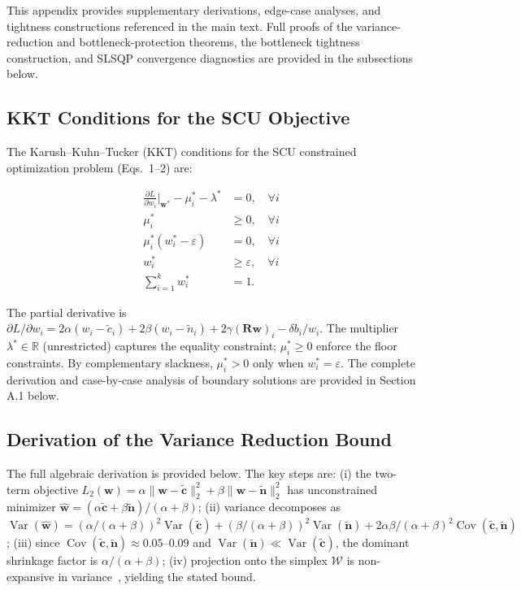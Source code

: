 \documentclass[a4paper,fleqn]{cas-sc}
\begin{document}
This appendix provides supplementary derivations, edge-case analyses, and tightness constructions referenced in the main text. Full proofs of the variance-reduction and bottleneck-protection theorems, the bottleneck tightness construction, and SLSQP convergence diagnostics are provided in the subsections below.

\subsection{KKT Conditions for the SCU Objective}
\label{app:kkt}

The Karush--Kuhn--Tucker (KKT) conditions for the SCU constrained optimization problem (Eqs.~1--2) are:

\begin{align}
\frac{\partial L}{\partial w_i}\bigg|_{\mathbf{w}^*} - \mu_i^* - \lambda^* &= 0, \quad \forall i \\
\mu_i^* &\ge 0, \quad \forall i \\
\mu_i^*(w_i^* - \varepsilon) &= 0, \quad \forall i \\
w_i^* &\ge \varepsilon, \quad \forall i \\
\sum_{i=1}^k w_i^* &= 1.
\end{align}

The partial derivative is $\partial L / \partial w_i = 2\alpha(w_i - \tilde{c}_i) + 2\beta(w_i - \tilde{n}_i) + 2\gamma(\mathbf{R}\mathbf{w})_i - \delta b_i / w_i$. The multiplier $\lambda^* \in \mathbb{R}$ (unrestricted) captures the equality constraint; $\mu_i^* \ge 0$ enforce the floor constraints. By complementary slackness, $\mu_i^* > 0$ only when $w_i^* = \varepsilon$. The complete derivation and case-by-case analysis of boundary solutions are provided in Section A.1 below.

\subsection{Derivation of the Variance Reduction Bound}
\label{app:variance-derivation}

The full algebraic derivation is provided below. The key steps are: (i) the two-term objective $L_2(\mathbf{w}) = \alpha\|\mathbf{w} - \tilde{\mathbf{c}}\|_2^2 + \beta\|\mathbf{w} - \tilde{\mathbf{n}}\|_2^2$ has unconstrained minimizer $\hat{\mathbf{w}} = (\alpha\tilde{\mathbf{c}} + \beta\tilde{\mathbf{n}})/(\alpha+\beta)$; (ii) variance decomposes as $\operatorname{Var}(\hat{\mathbf{w}}) = (\alpha/(\alpha+\beta))^2\operatorname{Var}(\tilde{\mathbf{c}}) + (\beta/(\alpha+\beta))^2\operatorname{Var}(\tilde{\mathbf{n}}) + 2\alpha\beta/(\alpha+\beta)^2\operatorname{Cov}(\tilde{\mathbf{c}}, \tilde{\mathbf{n}})$; (iii) since $\operatorname{Cov}(\tilde{\mathbf{c}}, \tilde{\mathbf{n}}) \approx 0.05$--$0.09$ and $\operatorname{Var}(\tilde{\mathbf{n}}) \ll \operatorname{Var}(\tilde{\mathbf{c}})$, the dominant shrinkage factor is $\alpha/(\alpha+\beta)$; (iv) projection onto the simplex $\mathcal{W}$ is non-expansive in variance~\citep{wang2013projection}, yielding the stated bound.
\end{document}
